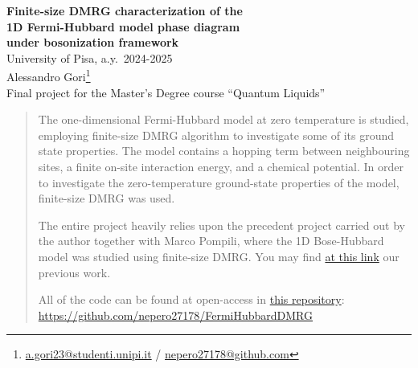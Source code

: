 \documentclass[a4paper]{article}
\begin{document}
\begin{center}
    {\bfseries {\Large Finite-size DMRG characterization of the}} \\[0.8em]
    {\bfseries {\Large 1D Fermi-Hubbard model phase diagram}}\\[0.8em]
    {\bfseries {\Large under bosonization framework}} \\[1em]
    \large University of Pisa, a.y.~2024-2025 \\[0.8em]
    Alessandro Gori\footnote{\href{mailto:a.gori23@studenti.unipi.it}{a.gori23@studenti.unipi.it} / \href{https://github.com/nepero27178}{nepero27178@github.com}} \\[0.8em]
    \scriptsize Final project for the Master's Degree course ``Quantum Liquids''
    
\end{center}

\renewcommand*{\thefootnote}{\arabic{footnote}}
\setcounter{footnote}{0}

\begin{abstract}
    The one-dimensional Fermi-Hubbard model at zero temperature is studied, employing finite-size DMRG algorithm to investigate some of its ground state properties. The model contains a hopping term between neighbouring sites, a finite on-site interaction energy, and a chemical potential. In order to investigate the zero-temperature ground-state properties of the model, finite-size DMRG was used. 
    
    The entire project heavily relies upon the precedent project carried out by the author together with Marco Pompili, where the 1D Bose-Hubbard model was studied using finite-size DMRG. You may find \href{https://github.com/mrc-pop/BoseHubbardDMRG}{at this link} our previous work.\\
    \begin{center}
        {\footnotesize All of the code can be found at open-access in \href{https://github.com/nepero27178/FermiHubbardDMRG}{this repository}:\\ \url{https://github.com/nepero27178/FermiHubbardDMRG}}
    \end{center}
\end{abstract}
\tableofcontents

\clearpage







\printbibliography \nocite{*}
\end{document}
